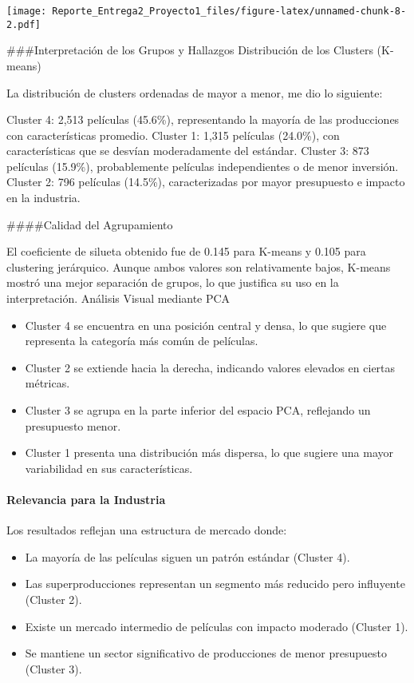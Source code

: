\documentclass[
]{article}
\providecommand{\tightlist}{%
  \setlength{\itemsep}{0pt}\setlength{\parskip}{0pt}}
\begin{document}
\texttt{[image: Reporte\_Entrega2\_Proyecto1\_files/figure-latex/unnamed-chunk-8-2.pdf]}

\#\#\#Interpretación de los Grupos y Hallazgos Distribución de los
Clusters (K-means)

La distribución de clusters ordenadas de mayor a menor, me dio lo
siguiente:

Cluster 4: 2,513 películas (45.6\%), representando la mayoría de las
producciones con características promedio. Cluster 1: 1,315 películas
(24.0\%), con características que se desvían moderadamente del estándar.
Cluster 3: 873 películas (15.9\%), probablemente películas
independientes o de menor inversión. Cluster 2: 796 películas (14.5\%),
caracterizadas por mayor presupuesto e impacto en la industria.

\#\#\#\#Calidad del Agrupamiento

El coeficiente de silueta obtenido fue de 0.145 para K-means y 0.105
para clustering jerárquico. Aunque ambos valores son relativamente
bajos, K-means mostró una mejor separación de grupos, lo que justifica
su uso en la interpretación. Análisis Visual mediante PCA

\begin{itemize}
\tightlist
\item
  Cluster 4 se encuentra en una posición central y densa, lo que sugiere
  que representa la categoría más común de películas.
\item
  Cluster 2 se extiende hacia la derecha, indicando valores elevados en
  ciertas métricas.
\item
  Cluster 3 se agrupa en la parte inferior del espacio PCA, reflejando
  un presupuesto menor.
\item
  Cluster 1 presenta una distribución más dispersa, lo que sugiere una
  mayor variabilidad en sus características.
\end{itemize}

\paragraph{Relevancia para la
Industria}\label{relevancia-para-la-industria}

Los resultados reflejan una estructura de mercado donde:

\begin{itemize}
\tightlist
\item
  La mayoría de las películas siguen un patrón estándar (Cluster 4).
\item
  Las superproducciones representan un segmento más reducido pero
  influyente (Cluster 2).
\item
  Existe un mercado intermedio de películas con impacto moderado
  (Cluster 1).
\item
  Se mantiene un sector significativo de producciones de menor
  presupuesto (Cluster 3).
\end{itemize}
\end{document}
